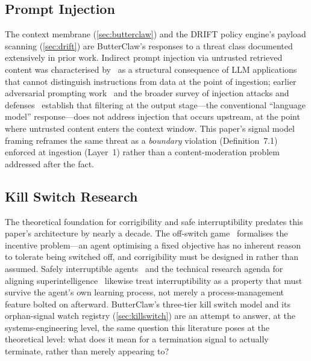 \documentclass[11pt,a4paper]{article}
\begin{document}
\subsection{Prompt Injection}

The context membrane (\cref{sec:butterclaw}) and the DRIFT policy engine's payload scanning
(\cref{sec:drift}) are ButterClaw's responses to a threat class documented extensively in prior
work. Indirect prompt injection via untrusted retrieved content was characterised
by~\cite{greshake2023injection} as a structural consequence of LLM applications that cannot
distinguish instructions from data at the point of ingestion; earlier adversarial prompting
work~\cite{perez2022ignore} and the broader survey of injection attacks and
defenses~\cite{liu2023promptinjection} establish that filtering at the output stage---the
conventional ``language model'' response---does not address injection that occurs upstream, at
the point where untrusted content enters the context window. This paper's signal model framing
reframes the same threat as a \emph{boundary} violation (Definition~7.1) enforced at ingestion
(Layer~1) rather than a content-moderation problem addressed after the fact.

\subsection{Kill Switch Research}

The theoretical foundation for corrigibility and safe interruptibility predates this paper's
architecture by nearly a decade. The off-switch game~\cite{hadfieldmenell2017offswitch} formalises
the incentive problem---an agent optimising a fixed objective has no inherent reason to tolerate
being switched off, and corrigibility must be designed in rather than assumed. Safely
interruptible agents~\cite{orseau2016interruptible} and the technical research agenda for aligning
superintelligence~\cite{soares2014aligning} likewise treat interruptibility as a property that
must survive the agent's own learning process, not merely a process-management feature bolted on
afterward. ButterClaw's three-tier kill switch model and its orphan-signal watch registry
(\cref{sec:killswitch}) are an attempt to answer, at the systems-engineering level, the same
question this literature poses at the theoretical level: what does it mean for a termination
signal to actually terminate, rather than merely appearing to?


\clearpage
\end{document}
